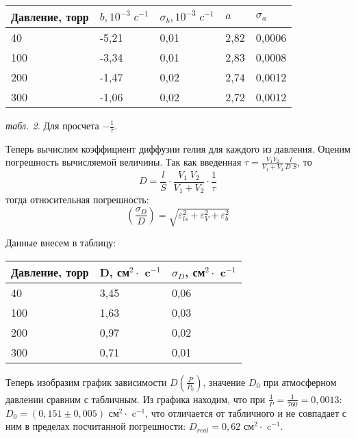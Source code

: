 \documentclass{article}
\begin{document}
\begin{center}
    \begin{tabular}{|m{7em}|m{5em}|m{5em}|m{3em}|m{3em}|}
        \hline
        Давление, торр & \(b, 10^{-3}\;c^{-1}\) & \(\sigma_{b}, 10^{-3}\;c^{-1}\) & \(a\) & \(\sigma_{a}\) \\
        \hline
        40  & -5,21 & 0,01 & 2,82 & 0,0006 \\
        \hline
        100 & -3,34 & 0,01 & 2,83 & 0,0008 \\
        \hline
        200 & -1,47 & 0,02 & 2,74 & 0,0012 \\
        \hline
        300 & -1,06 & 0,02 & 2,72 & 0,0012 \\
        \hline
    \end{tabular}

    \textit{табл. 2.} Для просчета \(- \frac{1}{\tau}\).
\end{center}

Теперь вычислим коэффициент диффузии гелия для каждого из давления. Оценим погрешность вычисляемой величины. Так как введенная \(\tau = \frac{V_{1} V_{2}}{V_{1} + V_{2}}\frac{l}{D\;S}\), то
\begin{equation}
    D = \frac{l}{S} \cdot \frac{V_{1}\; V_{2}}{V_{1} + V_{2}} \cdot \frac{1}{\tau}
\end{equation}
тогда относительная погрешность:
\begin{equation}
    \left(\frac{\sigma_{D}}{D}\right) = \sqrt {\varepsilon_{ls}^{2} + \varepsilon_{V}^{2} + \varepsilon_{b}^{2} }
\end{equation}

Данные внесем в таблицу:
\begin{center}
    \begin{tabular}{|m{7em}|m{6em}|m{6em}|}
        \hline
        Давление, торр & D, см\(^{2} \cdot\) c\(^{-1}\) & \(\sigma_{D}\), см\(^{2}\cdot\) c\(^{-1}\) \\
        \hline
        40  & 3,45 & 0,06 \\
        \hline
        100 & 1,63 & 0,03 \\
        \hline
        200 & 0,97 & 0,02 \\
        \hline
        300 & 0,71 & 0,01 \\
        \hline
    \end{tabular}
\end{center}

Теперь изобразим график зависимости \(D(\frac{P}{P_{0}})\), значение \(D_{0}\) при атмосферном давлении сравним с табличным. Из графика находим, что при \(\frac{1}{P} = \frac{1}{760} = 0,0013\): \(D_{0} = (0,151 \pm 0,005)\) см\(^{2} \cdot \) c\(^{-1}\), что отличается от табличного и не совпадает с ним в пределах посчитанной погрешности: \(D_{real} = 0,62\) см\(^{2} \cdot \) c\(^{-1}\).
\end{document}
